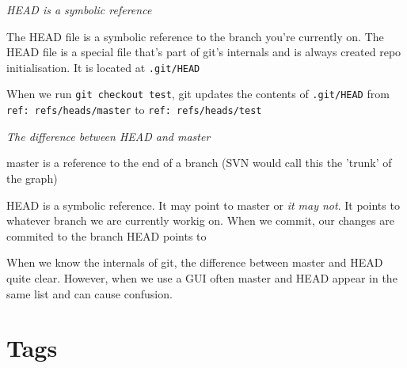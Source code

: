 \frmrule 

\textit{HEAD is a symbolic reference}

The HEAD file is a symbolic reference to the branch 
you're currently on. The HEAD file is a special file 
that's part of git's internals and is always created 
repo initialisation. It is located at \lstinline{.git/HEAD}

When we run \lstinline{git checkout test}, git updates 
the contents of \lstinline{.git/HEAD} from 
\lstinline{ref: refs/heads/master} to \lstinline{ref: refs/heads/test}

\frmrule 

\textit{The difference between HEAD and master}

master is a reference to the end of a branch 
(SVN would call this the 'trunk' of the graph) 

HEAD is a symbolic reference. It may point to master 
or \textit{it may not}. It points to whatever branch 
we are currently workig on. When we commit, 
our changes are commited to the branch HEAD points to


When we know the internals of git, the difference between 
master and HEAD quite clear. However, when we use a GUI 
often master and HEAD appear in the same list and can cause
confusion. 

\section{Tags}





\begin{figure}[h]
\end{figure}

